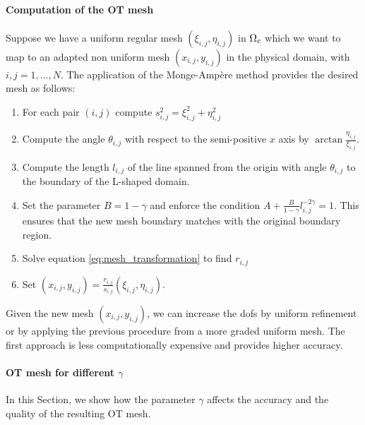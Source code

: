 \documentclass[a4paper,11pt]{article}
\begin{document}
{\paragraph{Computation of the OT mesh}

Suppose we have a uniform regular mesh $(\xi_{i,j},\eta_{i,j})$ in $\Omega_{c}$ which we want to map to an adapted non uniform mesh $(x_{i,j},y_{i,j})$ in the physical domain, with $i,j = 1,\dots,N$. The application of the Monge-Ampère method provides the desired mesh as follows:

\begin{enumerate}
    \item For each pair $(i,j)$ compute $s_{i,j}^{2} = \xi_{i,j}^{2} + \eta_{i,j}^{2}$
    \item Compute the angle $\theta_{i,j}$ with respect to the semi-positive $x$ axis by $\arctan{\frac{\eta_{i,j}}{\xi_{i,j}}}$. 
    \item Compute the length $l_{i,j}$ of the line spanned from the origin with angle $\theta_{i,j}$ to the boundary of the L-shaped domain.
    \item Set the parameter $B = 1 - \gamma$ and enforce the condition $A + \frac{B}{1-\gamma}l_{i,j}^{-2\gamma} = 1$. This ensures that the new mesh boundary matches with the original boundary region.
      
    \item Solve equation \eqref{eq:mesh_transformation} to find $r_{i,j}$
    \item Set $(x_{i,j},y_{i,j}) = \frac{r_{i,j}}{s_{i,j}}(\xi_{i,j},\eta_{i,j})$.
\end{enumerate}


Given the new mesh $(x_{i,j},y_{i,j})$, we can increase the dofs by uniform refinement or by applying the previous procedure from a more graded uniform mesh. The first approach is less computationally expensive and provides higher accuracy.


\paragraph{OT mesh for different $\gamma$}

In this Section, we show how the parameter $\gamma$ affects the accuracy and the quality of the resulting OT mesh. 


}
\end{document}
